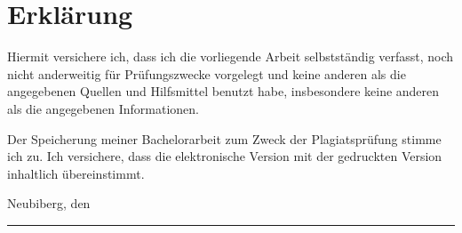 \newpage
\chapter*{Erklärung}


\vspace{1cm}

Hiermit versichere ich, dass ich die vorliegende Arbeit selbstständig verfasst, noch nicht anderweitig für Prüfungszwecke vorgelegt und keine anderen als die angegebenen Quellen und Hilfsmittel benutzt habe, insbesondere keine anderen als die angegebenen Informationen. \\
\hspace{\fill}
\vspace{0.5cm}

Der Speicherung meiner Bachelorarbeit zum Zweck der Plagiatsprüfung stimme ich zu. Ich versichere, dass die elektronische Version mit der gedruckten Version inhaltlich übereinstimmt.\\
\hspace{\fill}
\vspace{0.6cm}

Neubiberg, den \thePublicationDate 
\hspace{\fill}
\newline\hspace{\fill}\newline\hspace{\fill}\newline\hspace{\fill}\newline\hspace{\fill}
\rule{0.3\textwidth}{0.4pt} \newline
\theAuthor
\hspace{\fill}
\cleardoublepage